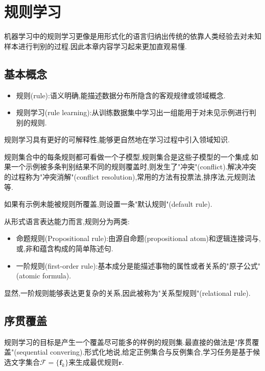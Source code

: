 \chapter{规则学习}

机器学习中的规则学习更像是用形式化的语言归纳出传统的依靠人类经验去对未知样本进行判别的过程.因此本章内容学习起来更加直观易懂.

\section{基本概念}

\begin{itemize}
\item 规则(rule):语义明确,能描述数据分布所隐含的客观规律或领域概念.
\item 规则学习(rule learning):从训练数据集中学习出一组能用于对未见示例进行判别的规则.
\end{itemize}

规则学习具有更好的可解释性,能够更自然地在学习过程中引入领域知识.

规则集合中的每条规则都可看做一个子模型,规则集合是这些子模型的一个集成.如果一个示例被多条判别结果不同的规则覆盖时,则发生了"冲突"(conflict).解决冲突的过程称为"冲突消解"(conflict resolution),常用的方法有投票法,排序法,元规则法等.

如果有示例未能被规则所覆盖,则设置一条"默认规则"(default rule).

从形式语言表达能力而言,规则分为两类:

\begin{itemize}
\item 命题规则(Propositional rule):由源自命题(propositional atom)和逻辑连接词与,或,非和蕴含构成的简单陈述句.
\item 一阶规则(first-order rule):基本成分是能描述事物的属性或者关系的"原子公式"(atomic formula).
\end{itemize}

显然,一阶规则能够表达更复杂的关系,因此被称为"关系型规则"(relational rule).

\section{序贯覆盖}

规则学习的目标是产生一个覆盖尽可能多的样例的规则集.最直接的做法是"序贯覆盖"(sequential convering).形式化地说,给定正例集合与反例集合,学习任务是基于候选文字集合$\mathcal F=\{\mathbf f_k\}$来生成最优规则$\mathbf r$.

